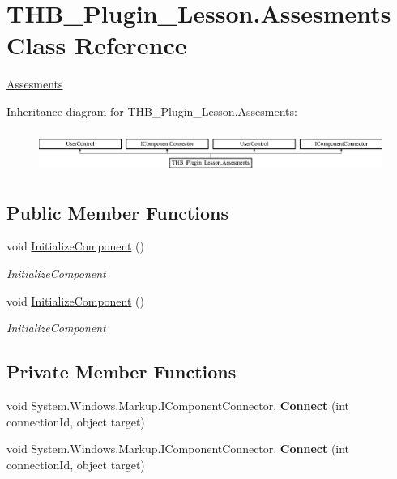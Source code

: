 \hypertarget{class_t_h_b___plugin___lesson_1_1_assesments}{}\section{T\+H\+B\+\_\+\+Plugin\+\_\+\+Lesson.\+Assesments Class Reference}
\label{class_t_h_b___plugin___lesson_1_1_assesments}


\mbox{\hyperlink{class_t_h_b___plugin___lesson_1_1_assesments}{Assesments}}  


Inheritance diagram for T\+H\+B\+\_\+\+Plugin\+\_\+\+Lesson.\+Assesments\+:\begin{figure}[H]
\begin{center}
\leavevmode
\includegraphics[height=1.379310cm]{d7/dc2/class_t_h_b___plugin___lesson_1_1_assesments}
\end{center}
\end{figure}
\subsection*{Public Member Functions}
\begin{DoxyCompactItemize}
\item 
void \mbox{\hyperlink{class_t_h_b___plugin___lesson_1_1_assesments_a22b672070dc6b0a67049489116347112}{Initialize\+Component}} ()
\begin{DoxyCompactList}\small\item\em Initialize\+Component \end{DoxyCompactList}\item 
void \mbox{\hyperlink{class_t_h_b___plugin___lesson_1_1_assesments_a22b672070dc6b0a67049489116347112}{Initialize\+Component}} ()
\begin{DoxyCompactList}\small\item\em Initialize\+Component \end{DoxyCompactList}\end{DoxyCompactItemize}
\subsection*{Private Member Functions}
\begin{DoxyCompactItemize}
\item 
\mbox{\label{class_t_h_b___plugin___lesson_1_1_assesments_a42de142372ed19e056c775d8a76afd61}} 
void System.\+Windows.\+Markup.\+I\+Component\+Connector. {\bfseries Connect} (int connection\+Id, object target)
\item 
\mbox{\label{class_t_h_b___plugin___lesson_1_1_assesments_a42de142372ed19e056c775d8a76afd61}} 
void System.\+Windows.\+Markup.\+I\+Component\+Connector. {\bfseries Connect} (int connection\+Id, object target)
\end{DoxyCompactItemize}
